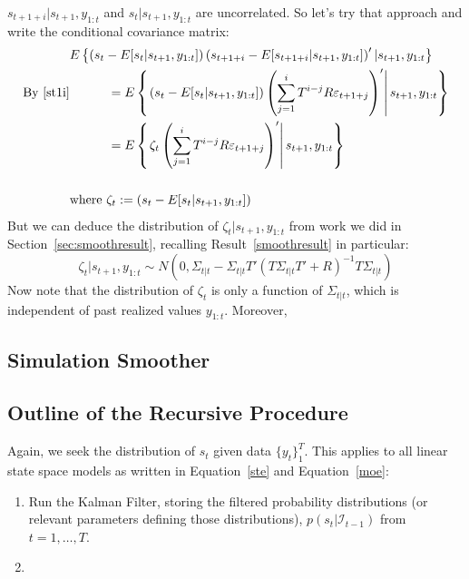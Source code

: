 \documentclass[a4paper,12pt]{article}
\begin{document}
\begin{enumerate}
    $s_{t+1+i}|s_{t+1},y_{1:t}$ and $s_t|s_{t+1},y_{1:t}$ are
    uncorrelated.  So let's try that approach and write the
    conditional covariance matrix:
    \begin{align*}
      &E\left\{
        \left(s_t - E[s_t|s_{t+1},y_{1:t}]\right)
        \left(s_{t+1+i} - E[s_{t+1+i}|s_{t+1},y_{1:t}]\right)'
        | s_{t+1},y_{1:t}
      \right\}  \\
      \text{By~\ref{st1i}}
      &\quad\qquad =
      E\left\{\left.
        \left(s_t - E[s_t|s_{t+1},y_{1:t}]\right)
        \left(\sum^i_{j=1} T^{i-j} R \varepsilon_{t+1+j}\right)'
        \right\rvert s_{t+1},y_{1:t}
      \right\}  \\
      &\quad\qquad =
      E\left\{\left.
        \zeta_t
        \left(\sum^i_{j=1} T^{i-j} R \varepsilon_{t+1+j}\right)'
        \right\rvert s_{t+1},y_{1:t}
      \right\} \\\\
      &\text{where }
      \zeta_t :=  \left(s_t - E[s_t|s_{t+1},y_{1:t}]\right)
    \end{align*}
    But we can deduce the distribution of $\zeta_t | s_{t+1}, y_{1:t}$
    from work we did in Section~\ref{sec:smoothresult}, recalling
    Result~\ref{smoothresult} in particular:
    \begin{equation}
      \zeta_t| s_{t+1}, y_{1:t}\sim
      N(0, \Sigma_{t|t} - \Sigma_{t|t}T'
           \left(T\Sigma_{t|t} T'+R\right)^{-1} T\Sigma_{t|t})
    \end{equation}
    Now note that the distribution of $\zeta_t$ is only a function of
    $\Sigma_{t|t}$, which is independent of past realized values
    $y_{1:t}$. Moreover,

\end{enumerate}







\subsection{Simulation Smoother}



\subsection{Outline of the Recursive Procedure}

Again, we seek the distribution of $s_t$ given data $\{y_t\}^T_1$. This
applies to all linear state space models as written in
Equation~\ref{ste} and Equation~\ref{moe}:
\begin{enumerate}
  \item Run the Kalman Filter, storing the filtered
    probability distributions (or relevant parameters
    defining those distributions),
    $p(s_t|\mathcal{I}_{t-1})$ from $t=1,\ldots,T$.
  \item
\end{enumerate}
\end{document}
